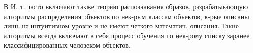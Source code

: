 \documentclass[10pt]{article}
\begin{document}
В И. т. часто включают также теорию распознавания образов, разрабатывающую алгоритмы распределения объектов по нек-рым классам объектов, к-рые описаны лишь на интуитивном уровне и не имеют четкого математич. описания. Такие алгоритмы всегда включают в себя процесс обучения по нек-рому списку заранее классифицированных человеком объектов.
\end{document}
